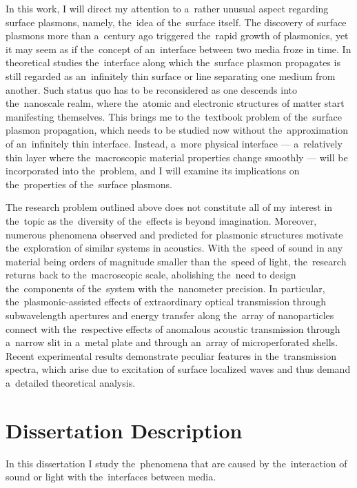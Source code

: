 In this work, I will direct my attention to a~rather unusual aspect regarding surface plasmons, namely, the~idea of the~surface itself.
The discovery of surface plasmons more than a~century ago \cite{maier2} triggered the~rapid growth of plasmonics, yet it may seem as if the~concept of an~interface between two media froze in time.
In theoretical studies the~interface along which the~surface plasmon propagates is still regarded as an~infinitely thin surface or line separating one medium from another.
Such status quo has to be reconsidered as one descends into the~nanoscale realm, where the~atomic and electronic structures of matter start manifesting themselves.
This brings me to the~textbook problem of the~surface plasmon propagation, which needs to be studied now without the~approximation of an~infinitely thin interface.
Instead, a~more physical interface --- a~relatively thin layer where the~macroscopic material properties change smoothly --- will be incorporated into the~problem, and I will examine its implications on the~properties of the~surface plasmons.

The research problem outlined above does not constitute all of my interest in the~topic as the~diversity of the~effects is beyond imagination.
Moreover, numerous phenomena observed and predicted for plasmonic structures motivate the~exploration of similar systems in acoustics.
With the~speed of sound in any material being orders of magnitude smaller than the~speed of light, the~research returns back to the~macroscopic scale, abolishing the~need to design the~components of the~system with the~nanometer precision.
In particular, the~plasmonic-assisted effects of extraordinary optical transmission through subwavelength apertures \cite{ebbesen} and energy transfer along the~array of nanoparticles \cite{quinten} connect with the~respective effects of anomalous acoustic transmission through a~narrow slit in a~metal plate and through an~array of microperforated shells.
Recent experimental results \cite{adv,garcia1} demonstrate peculiar features in the~transmission spectra, which arise due to excitation of surface localized waves and thus demand a~detailed theoretical analysis.


\section{Dissertation Description}

In this dissertation I study the~phenomena that are caused by the~interaction of sound or light with the~interfaces between media.

